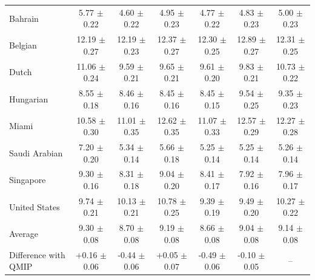 \begin{tabular}{lcccccc}
\midrule
Bahrain & 5.77 $\pm$ 0.22\vten{$^{\dagger}$} & 4.60 $\pm$ 0.22\vten{$^{*}$} & 4.95 $\pm$ 0.23 & 4.77 $\pm$ 0.22\vten{$^{*}$} & 4.83 $\pm$ 0.23\vten{$^{*}$} & 5.00 $\pm$ 0.23 \\
Belgian & 12.19 $\pm$ 0.27 & 12.19 $\pm$ 0.23 & 12.37 $\pm$ 0.27 & 12.30 $\pm$ 0.25 & 12.89 $\pm$ 0.27\vten{$^{\dagger}$} & 12.31 $\pm$ 0.25 \\
Dutch & 11.06 $\pm$ 0.24\vten{$^{\dagger}$} & 9.59 $\pm$ 0.21\vten{$^{*}$} & 9.65 $\pm$ 0.21\vten{$^{*}$} & 9.61 $\pm$ 0.20\vten{$^{*}$} & 9.83 $\pm$ 0.21\vten{$^{*}$} & 10.73 $\pm$ 0.22 \\
Hungarian & 8.55 $\pm$ 0.18\vten{$^{*}$} & 8.46 $\pm$ 0.16\vten{$^{*}$} & 8.45 $\pm$ 0.16\vten{$^{*}$} & 8.45 $\pm$ 0.15\vten{$^{*}$} & 9.54 $\pm$ 0.25\vten{$^{\dagger}$} & 9.35 $\pm$ 0.23 \\
Miami & 10.58 $\pm$ 0.30\vten{$^{*}$} & 11.01 $\pm$ 0.35\vten{$^{*}$} & 12.62 $\pm$ 0.35\vten{$^{\dagger}$} & 11.07 $\pm$ 0.33\vten{$^{*}$} & 12.57 $\pm$ 0.29\vten{$^{\dagger}$} & 12.27 $\pm$ 0.28 \\
Saudi Arabian & 7.20 $\pm$ 0.20\vten{$^{\dagger}$} & 5.34 $\pm$ 0.14 & 5.66 $\pm$ 0.18\vten{$^{\dagger}$} & 5.25 $\pm$ 0.14 & 5.25 $\pm$ 0.14 & 5.26 $\pm$ 0.14 \\
Singapore & 9.30 $\pm$ 0.16\vten{$^{\dagger}$} & 8.31 $\pm$ 0.18\vten{$^{\dagger}$} & 9.04 $\pm$ 0.20\vten{$^{\dagger}$} & 8.41 $\pm$ 0.17\vten{$^{\dagger}$} & 7.92 $\pm$ 0.16 & 7.96 $\pm$ 0.17 \\
United States & 9.74 $\pm$ 0.21\vten{$^{*}$} & 10.13 $\pm$ 0.21 & 10.78 $\pm$ 0.25\vten{$^{\dagger}$} & 9.39 $\pm$ 0.19\vten{$^{*}$} & 9.49 $\pm$ 0.20\vten{$^{*}$} & 10.27 $\pm$ 0.22 \\
\midrule
Average & 9.30 $\pm$ 0.08\vten{$^{\dagger}$} & 8.70 $\pm$ 0.08\vten{$^{*}$} & 9.19 $\pm$ 0.08 & 8.66 $\pm$ 0.08\vten{$^{*}$} & 9.04 $\pm$ 0.08\vten{$^{*}$} & 9.14 $\pm$ 0.08 \\
Difference with QMIP & +0.16 $\pm$ 0.06 & -0.44 $\pm$ 0.06 & +0.05 $\pm$ 0.07 & -0.49 $\pm$ 0.06 & -0.10 $\pm$ 0.05 & -- \\
\bottomrule
\end{tabular}
